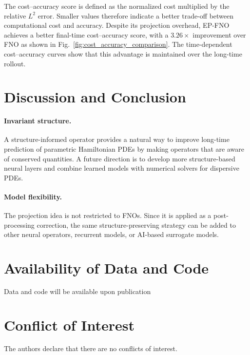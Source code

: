 \documentclass[11pt,a4paper]{article}
\theoremstyle{definition}
\theoremstyle{remark}
\numberwithin{equation}{section}
\numberwithin{figure}{section}
\numberwithin{table}{section}
\begin{document}
The cost--accuracy score is defined as the normalized cost multiplied by the
relative $L^2$ error. Smaller values therefore indicate a better trade-off
between computational cost and accuracy. Despite its projection overhead,
EP-FNO achieves a better final-time cost--accuracy score, with a $\mathbf{3.26\times}$
improvement over FNO as shown in Fig.~\ref{fig:cost_accuracy_comparison}.
The time-dependent cost--accuracy curves show that this advantage is maintained
over the long-time rollout.






% 
% 
% 
% 


\section{Discussion and Conclusion}
\label{sec:discussion}

\paragraph{Invariant structure.}
A structure-informed operator provides a natural way to improve 
long-time prediction of parametric Hamiltonian PDEs by making operators that are aware of conserved quantities.  A future direction is to develop more structure-based neural layers \cite{woodward2023mori} and
combine learned models with numerical solvers for dispersive PDEs. 

\paragraph{Model flexibility.}
The projection idea is not restricted to FNOs. Since it is applied as a
post-processing correction, the same structure-preserving strategy can be added
to other neural operators, recurrent models, or AI-based surrogate models.
\section*{Availability of Data and Code}
Data and code will be available upon publication

\section*{Conflict of Interest}
The authors declare that there are no conflicts of interest.
\end{document}
